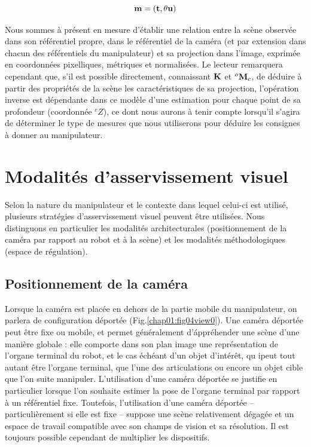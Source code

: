 \begin{equation}
{\bf m} = ({\bf t}, \theta {\bf u})  
\label{chap01:eq10}
\end{equation}

Nous sommes \`a pr\'esent en mesure d'établir une relation entre la scène 
observée dans son référentiel propre, dans le r\'ef\'erentiel de la cam\'era (et 
par extension dans chacun des r\'ef\'erentiels du manipulateur) et sa projection 
dans l'image, exprimée en coordonnées pixelliques, métriques et normalisées. Le 
lecteur remarquera cependant que, s'il est possible directement, connaissant 
${\bf K}$ et ${}^o{\bf M}_c$, de déduire à partir des propriétés de la scène 
les caractéristiques de sa projection, l'opération inverse est dépendante dans 
ce modèle d'une estimation pour chaque point de sa profondeur (coordonnée 
${}^cZ$), ce dont nous aurons \`a tenir compte lorsqu'il s'agira de d\'eterminer 
le type de mesures que nous utiliserons pour d\'eduire les consignes \`a donner 
au manipulateur.

\section{Modalit\'es d'asservissement visuel} 
\label{chap1-1}

Selon la nature du manipulateur et le contexte dans lequel celui-ci est 
utilis\'e, plusieurs strat\'egies d'asservissement visuel peuvent \^etre 
utilis\'ees. Nous distinguons en particulier les modalit\'es architecturales 
(positionnement de la cam\'era par rapport au robot et \`a la sc\`ene) et les 
modalit\'es m\'ethodologiques (espace de r\'egulation).

\subsection{Positionnement de la caméra} \label{chap1-1-0}

Lorsque la cam\'era est plac\'ee en dehors de la partie mobile du manipulateur, 
on parlera de configuration déportée (Fig.\ref{chap01:fig04view0}). Une cam\'era 
d\'eport\'ee peut \^etre fixe ou mobile, et permet g\'en\'eralement 
d'\'appr\'ehender une sc\`ene d'une mani\`ere globale : elle comporte dans son 
plan image une repr\'esentation de l'organe terminal du robot, et le cas 
\'ech\'eant d'un objet d'int\'er\^et, qu ipeut tout autant \^etre l'organe 
terminal, que l'une des articulations ou encore un objet cible que l'on suite 
manipuler. L'utilisation d'une cam\'era d\'eport\'ee se justifie en particulier 
lorsque l'on souhaite estimer la pose de l'organe terminal par rapport \`a un 
r\'ef\'erentiel fixe. Toutefois, l'utilisation d'une cam\'era d\'eport\'ee -- 
particuli\`erement si elle est fixe -- suppose une sc\`ene relativement 
d\'egag\'ee et un espace de travail compatible avec son champs de vision et sa 
r\'esolution. Il est toujours possible cependant de multiplier les 
dispositifs.

